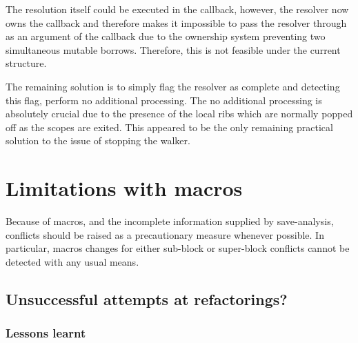 The resolution itself could be executed in the callback, however, the resolver now owns the callback and therefore makes it impossible to pass the resolver through as an argument of the callback due to the ownership system preventing two simultaneous mutable borrows. Therefore, this is not feasible under the current structure.

The remaining solution is to simply flag the resolver as complete and detecting this flag, perform no additional processing. The no additional processing is absolutely crucial due to the presence of the local ribs which are normally popped off as the scopes are exited. This appeared to be the only remaining practical solution to the issue of stopping the walker.

\section{Limitations with macros}
Because of macros, and the incomplete information supplied by save-analysis, conflicts should be raised as a precautionary measure whenever possible. In particular, macros changes for either sub-block or super-block conflicts cannot be detected with any usual means.

\subsection{Unsuccessful attempts at refactorings?}
\subsubsection{Lessons learnt}